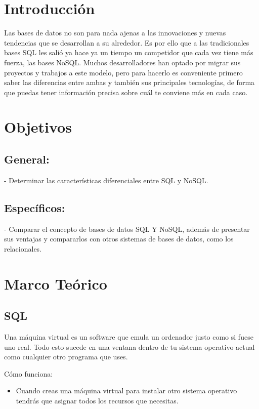 \documentclass[%
 reprint,
 amsmath,amssymb,
 aps,
]{revtex4-1}
\begin{document}
\maketitle


\section {Introducción}\label{sec:1}

Las bases de datos no son para nada ajenas a las innovaciones y nuevas tendencias que se desarrollan a su alrededor. Es por ello que a las tradicionales bases SQL les salió ya hace ya un tiempo un competidor que cada vez tiene más fuerza, las bases NoSQL. Muchos desarrolladores han optado por migrar sus proyectos y trabajos a este modelo, pero para hacerlo es conveniente primero saber las diferencias entre ambas y también sus principales tecnologías, de forma que puedas tener información precisa sobre cuál te conviene más en cada caso.



\section{Objetivos}\label{sec:2}
\subsection{General:}
-  Determinar las características diferenciales entre  SQL y  NoSQL.
\subsection{Específicos:}
-  Comparar el concepto de bases de datos SQL Y  NoSQL, además de presentar sus ventajas y compararlos con otros sistemas de bases de datos, como los relacionales.


\section {Marco Teórico}\label{sec:3}

\subsection{SQL}
\par Una máquina virtual es un software que emula un ordenador justo como si fuese uno real. Todo esto sucede en una ventana dentro de tu sistema operativo actual como cualquier otro programa que uses.
\par Cómo funciona:
	\begin{itemize}
		\item Cuando creas una máquina virtual para instalar otro sistema operativo tendrás que asignar todos los recursos que necesitas.
	\end{itemize}
\end{document}
